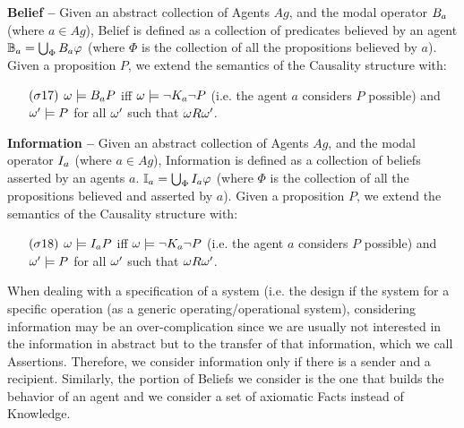 \begin{definition}{\bf Belief --}\label{def:belief}
	Given an abstract collection of Agents $Ag$, and the modal operator
	$B_{a}$ (where $a\in Ag$), Belief is defined as a collection
	of predicates believed by an agent $\mathbb{B}_{a}=\bigcup_\Phi B_{a}\varphi$
	(where $\Phi$ is the collection of all the propositions believed by $a$).
	Given a proposition $P$, we extend the semantics of the Causality structure with:
	\begin{enumerate}[noitemsep]
		\item[$(\sigma17)$] $\omega\models B_{a}P$ iff
			$\omega\models\neg K_{a}\neg P$ (i.e. the agent $a$ considers $P$ possible) 
			and $\omega'\models P$ for all
			$\omega'$ such that $\omega R\omega'$.
	\end{enumerate}
\end{definition}

\begin{definition}{\bf Information --}\label{def:information}
	Given an abstract collection of Agents $Ag$, and the modal operator
	$I_{a}$ (where $a\in Ag$), Information is defined as a collection
	of beliefs asserted by an agents $a$.
	$\mathbb{I}_{a}=\bigcup_\Phi I_{a}{\varphi}$
	(where $\Phi$ is the collection of all the propositions believed and asserted by $a$).
	Given a proposition $P$, we extend the semantics of the Causality structure with:
	\begin{enumerate}[noitemsep]
		\item[$(\sigma18)$] $\omega\models I_{a}P$ iff
			$\omega\models\neg K_{a}\neg P$ (i.e. the agent $a$ considers $P$ possible) 
			and $\omega'\models P$ for all
			$\omega'$ such that $\omega R\omega'$.
	\end{enumerate}
\end{definition}

When dealing with a specification of a system (i.e. the design if the system
for a specific operation (as a generic operating/operational system),
considering information may be an over-complication since we are usually not
interested in the information in abstract but to the transfer of that
information, which we call Assertions. Therefore, we consider information only
if there is a sender and a recipient.  Similarly, the portion of Beliefs we
consider is the one that builds the behavior of an agent and we consider a set
of axiomatic Facts instead of Knowledge.


